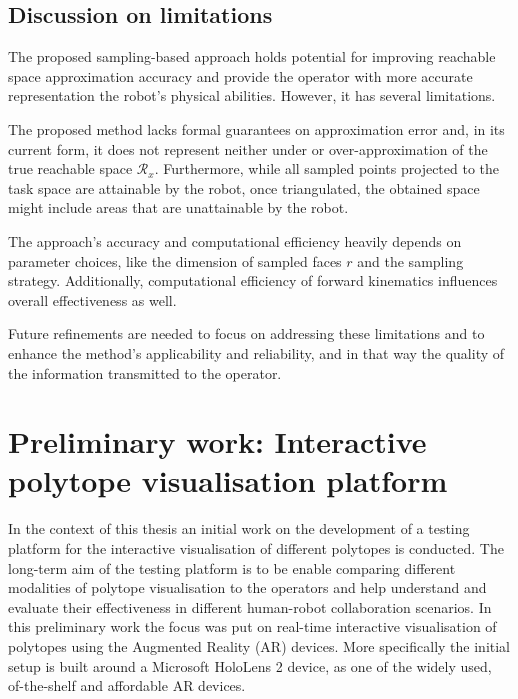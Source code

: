 \subsection{Discussion on limitations}

The proposed sampling-based approach holds potential for improving reachable space approximation accuracy and provide the operator with more accurate representation the robot's physical abilities. However, it has several limitations. 

The proposed method lacks formal guarantees on approximation error and, in its current form, it does not represent neither under or over-approximation of the true reachable space $\mathcal{R}_x$. Furthermore, while all sampled points projected to the task space are attainable by the robot, once triangulated, the obtained space might include areas that are unattainable by the robot.

The approach's accuracy and computational efficiency heavily depends on parameter choices, like the dimension of sampled faces $r$ and the sampling strategy. Additionally, computational efficiency of forward kinematics influences overall effectiveness as well. 

Future refinements are needed to focus on addressing these limitations and to enhance the method's applicability and reliability, and in that way the quality of the information transmitted to the operator.


\section{Preliminary work: Interactive polytope visualisation platform}
\label{ch:claire}


In the context of this thesis an initial work on the development of a testing platform for the interactive visualisation of different polytopes is conducted.
The long-term aim of the testing platform is to be enable comparing different modalities of polytope visualisation to the operators and help understand and evaluate their effectiveness in different human-robot collaboration scenarios. In this preliminary work the focus was put on real-time interactive visualisation of polytopes using the Augmented Reality (AR) devices. More specifically the initial setup is built around a Microsoft HoloLens 2 device, as one of the widely used, of-the-shelf and affordable AR devices.




